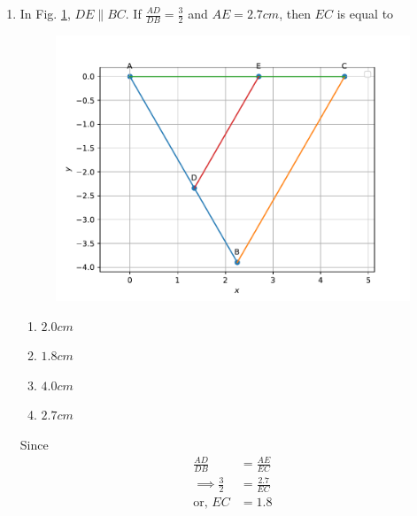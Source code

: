 \documentclass[journal,12pt,twocolumn]{IEEEtran}
\renewcommand\thesection{\arabic{section}}
\begin{document}
\begin{enumerate}[label=\thesection.\arabic*.,ref=\thesection.\theenumi]
\item In Fig. 
	  \ref{fig:matrix-10-19.pdf},
$DE \parallel BC$. If $\frac{AD}{DB} = \frac{3}{2}$ and $AE = 2.7cm$, then $EC$ is equal to 
  \begin{figure}
	  \centering 
	  \includegraphics[width=\columnwidth]{figs/matrix-10-19.pdf}
	  \caption{}
	  \label{fig:matrix-10-19.pdf}
	  \end{figure}
\begin{enumerate}
    \item $2.0 cm$
    \item $1.8 cm$
    \item $4.0 cm$
    \item $2.7 cm$
\end{enumerate}
\solution Since 
\begin{align}
	\frac{AD}{DB}  &= 
	\frac{AE}{EC}
	\\
	\implies \frac{3}{2}&= \frac{2.7}{EC}
	\\
	\text{or, }
	EC & = 1.8
\end{align}

 


\end{enumerate}
\end{document}
